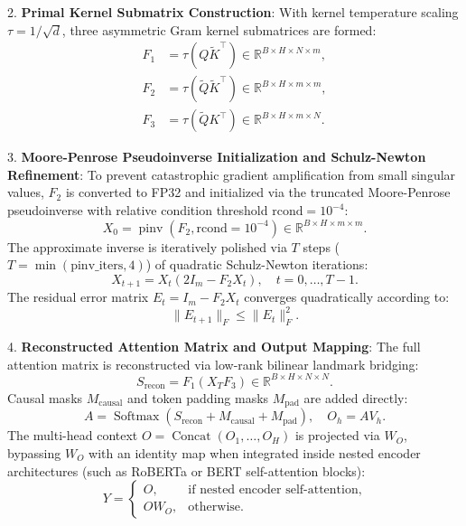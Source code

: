 2. \textbf{Primal Kernel Submatrix Construction}:
With kernel temperature scaling $\tau = 1 / \sqrt{d}$, three asymmetric Gram kernel submatrices are formed:
\begin{align}
F_1 &= \tau \left(Q \widetilde{K}^\top\right) \in \mathbb{R}^{B \times H \times N \times m}, \\
F_2 &= \tau \left(\widetilde{Q} \widetilde{K}^\top\right) \in \mathbb{R}^{B \times H \times m \times m}, \\
F_3 &= \tau \left(\widetilde{Q} K^\top\right) \in \mathbb{R}^{B \times H \times m \times N}.
\end{align}

3. \textbf{Moore-Penrose Pseudoinverse Initialization and Schulz-Newton Refinement}:
To prevent catastrophic gradient amplification from small singular values, $F_2$ is converted to FP32 and initialized via the truncated Moore-Penrose pseudoinverse with relative condition threshold $\text{rcond} = 10^{-4}$:
\begin{equation}
X_0 = \operatorname{pinv}(F_2, \text{rcond}=10^{-4}) \in \mathbb{R}^{B \times H \times m \times m}.
\end{equation}
The approximate inverse is iteratively polished via $T$ steps ($T = \min(\text{pinv\_iters}, 4)$) of quadratic Schulz-Newton iterations:
\begin{equation}
X_{t+1} = X_t \left(2 I_m - F_2 X_t\right), \quad t = 0, \dots, T-1.
\end{equation}
The residual error matrix $E_t = I_m - F_2 X_t$ converges quadratically according to:
\begin{equation}
\|E_{t+1}\|_F \le \|E_t\|_F^2.
\end{equation}

4. \textbf{Reconstructed Attention Matrix and Output Mapping}:
The full attention matrix is reconstructed via low-rank bilinear landmark bridging:
\begin{equation}
S_{\text{recon}} = F_1 \left(X_T F_3\right) \in \mathbb{R}^{B \times H \times N \times N}.
\end{equation}
Causal masks $M_{\text{causal}}$ and token padding masks $M_{\text{pad}}$ are added directly:
\begin{equation}
A = \operatorname{Softmax}(S_{\text{recon}} + M_{\text{causal}} + M_{\text{pad}}), \quad O_h = A V_h.
\end{equation}
The multi-head context $O = \operatorname{Concat}(O_1, \dots, O_H)$ is projected via $W_O$, bypassing $W_O$ with an identity map when integrated inside nested encoder architectures (such as RoBERTa or BERT self-attention blocks):
\begin{equation}
Y = \begin{cases}
O, & \text{if nested encoder self-attention}, \\
O W_O, & \text{otherwise}.
\end{cases}
\end{equation}


